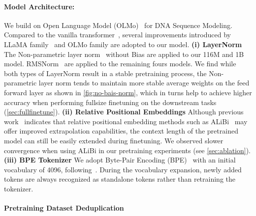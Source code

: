 \paragraph{Model Architecture:} We build on Open Language Model (OLMo)~\citep{groeneveld2024olmo} for DNA Sequence Modeling. Compared to the vanilla transformer~\citep{vaswani2017attention},  several improvements introduced by LLaMA family~\citep{touvron2023llama} and OLMo family are adopted to our model. 
    \textbf{(i) LayerNorm} The Non-parametric layer norm~\citep{ba2016layer} without Bias are applied to our 116M and 1B model. RMSNorm~\citep{zhang2019root} are applied to the remaining fours models. We find while both types of LayerNorm result in a stable pretraining process, the Non-parametric layer norm tends to maintain more stable average weights on the feed forward layer as shown in \cref{fig:no-bais-norm}, which in turns help to achieve higher accuracy when performing fullsize finetuning on the downstream tasks (\cref{sec:fullfinetune}).
    \textbf{(ii) Relative Positional Embeddings} 
    Although previous work~\cite{zhou2023dnabert} indicates that relative positional embedding methods such as ALiBi~\cite{press2021train} may offer improved extrapolation capabilities, the context length of the pretrained model can still be easily extended during finetuning. We observed slower convergence when using ALiBi in our pretraining experiments (see \cref{sec:ablation}).
    \textbf{(iii) BPE Tokenizer} We adopt Byte-Pair Encoding (BPE)~\cite{sennrich2015neural} with an initial vocabulary of 4096, following~\citet{zhou2023dnabert}. During the vocabulary expansion, newly added tokens are always recognized as standalone tokens rather than retraining the tokenizer.
    

\paragraph{Pretraining Dataset Deduplication}

